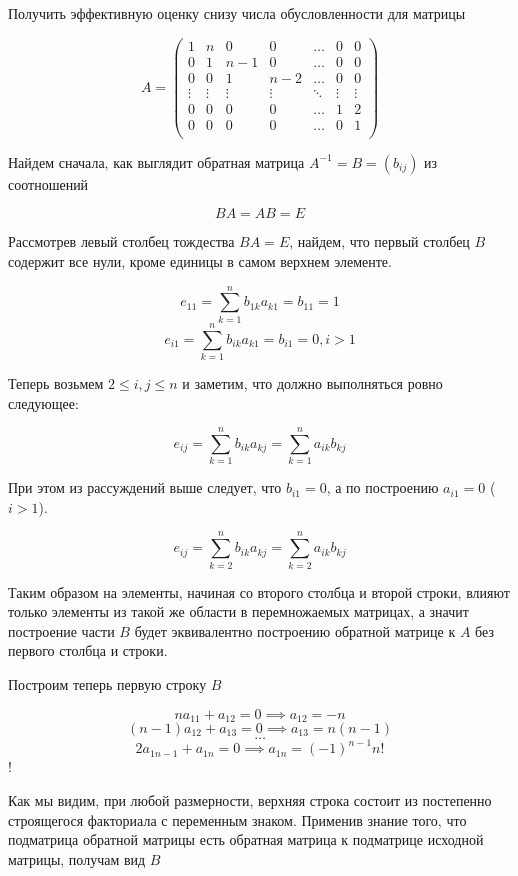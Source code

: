 \documentclass[11pt,a4paper,oneside]{article}
\begin{document}
\begin{problem}
	Получить эффективную оценку снизу числа обусловленности для матрицы
	
	$$A = \left(\begin{matrix}
		1 & n & 0 & 0 & \dots & 0 & 0 \\
		0 & 1 & n - 1 & 0 & \dots & 0 & 0 \\
		0 & 0 & 1 & n - 2 & \dots & 0 & 0 \\
		\vdots & \vdots & \vdots & \vdots & \ddots & \vdots & \vdots \\
		0 & 0 & 0 & 0 & \dots & 1 & 2 \\
		0 & 0 & 0 & 0 & \dots & 0 & 1 \\
	\end{matrix}\right)$$
\end{problem}

Найдем сначала, как выглядит обратная матрица $A^{-1} = B = (b_{ij})$ из соотношений

$$ BA = AB = E $$

Рассмотрев левый столбец тождества $BA = E$, найдем, что первый столбец $B$ содержит все нули, кроме единицы в самом верхнем элементе.

$$ e_{11} = \sum_{k = 1}^{n} b_{1k} a_{k1} = b_{11} = 1 $$
$$ e_{i1} = \sum_{k = 1}^{n} b_{ik} a_{k1} = b_{i1} = 0, i > 1 $$

Теперь возьмем $2 \le i, j \le n$ и заметим, что должно выполняться ровно следующее:

$$ e_{ij} = \sum_{k = 1}^{n} b_{ik} a_{kj} = \sum_{k = 1}^{n} a_{ik} b_{kj} $$

При этом из рассуждений выше следует, что $b_{i1} = 0$, а по построению $a_{i1} = 0$ ($i > 1$).

$$ e_{ij} = \sum_{k = 2}^{n} b_{ik} a_{kj} = \sum_{k = 2}^{n} a_{ik} b_{kj} $$

Таким образом на элементы, начиная со второго столбца и второй строки, влияют только элементы из такой же области в перемножаемых матрицах, а значит построение части $B$ будет эквивалентно построению обратной матрице к $A$ без первого столбца и строки.

Построим теперь первую строку $B$

$$ n a_{11} + a_{12} = 0 \implies a_{12} = -n $$
$$ (n - 1) a_{12} + a_{13} = 0 \implies a_{13} = n (n - 1) $$
$$ \dots $$
$$ 2 a_{1 n-1} + a_{1n} = 0 \implies a_{1n} = (-1)^{n - 1} n! $$!

Как мы видим, при любой размерности, верхняя строка состоит из постепенно строящегося факториала с переменным знаком. Применив знание того, что подматрица обратной матрицы есть обратная матрица к подматрице исходной матрицы, получам вид $B$
\end{document}

